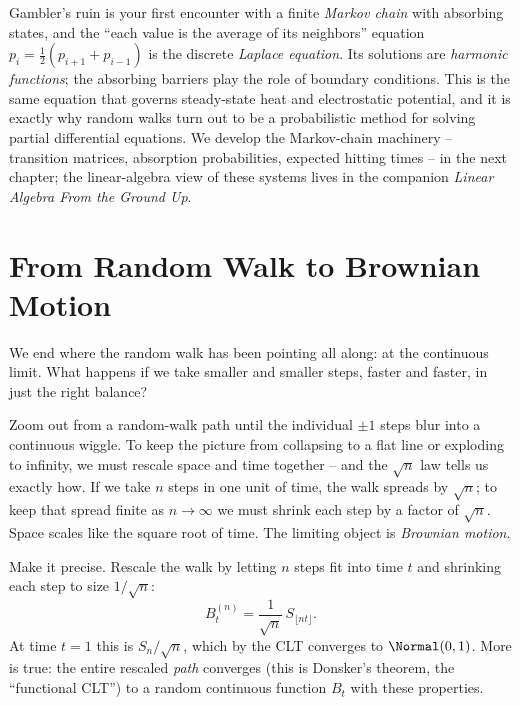 \begin{connectionbox}
Gambler's ruin is your first encounter with a finite \emph{Markov chain} with
absorbing states, and the ``each value is the average of its neighbors''
equation $p_i = \tfrac12(p_{i+1}+p_{i-1})$ is the discrete \emph{Laplace
equation}. Its solutions are \emph{harmonic functions}; the absorbing barriers
play the role of boundary conditions. This is the same equation that governs
steady-state heat and electrostatic potential, and it is exactly why random
walks turn out to be a probabilistic method for solving partial differential
equations. We develop the Markov-chain machinery -- transition matrices,
absorption probabilities, expected hitting times -- in the next chapter; the
linear-algebra view of these systems lives in the companion \emph{Linear
Algebra From the Ground Up}.
\end{connectionbox}

\section{From Random Walk to Brownian Motion}
\label{ch26:brownian}

We end where the random walk has been pointing all along: at the continuous
limit. What happens if we take smaller and smaller steps, faster and faster, in
just the right balance?

\begin{intuitionbox}
Zoom out from a random-walk path until the individual $\pm 1$ steps blur into a
continuous wiggle. To keep the picture from collapsing to a flat line or
exploding to infinity, we must rescale space and time together -- and the
$\sqrt{n}$ law tells us exactly how. If we take $n$ steps in one unit of time,
the walk spreads by $\sqrt{n}$; to keep that spread finite as $n \to \infty$ we
must shrink each step by a factor of $\sqrt{n}$. Space scales like the square
root of time. The limiting object is \emph{Brownian motion}.
\end{intuitionbox}

Make it precise. Rescale the walk by letting $n$ steps fit into time $t$ and
shrinking each step to size $1/\sqrt{n}$:
\[
  B_t^{(n)} = \frac{1}{\sqrt{n}}\, S_{\lfloor nt \rfloor}.
\]
At time $t = 1$ this is $S_n/\sqrt{n}$, which by the CLT converges to
$\Normal(0, 1)$. More is true: the entire rescaled \emph{path} converges (this
is Donsker's theorem, the ``functional CLT'') to a random continuous function
$B_t$ with these properties.

